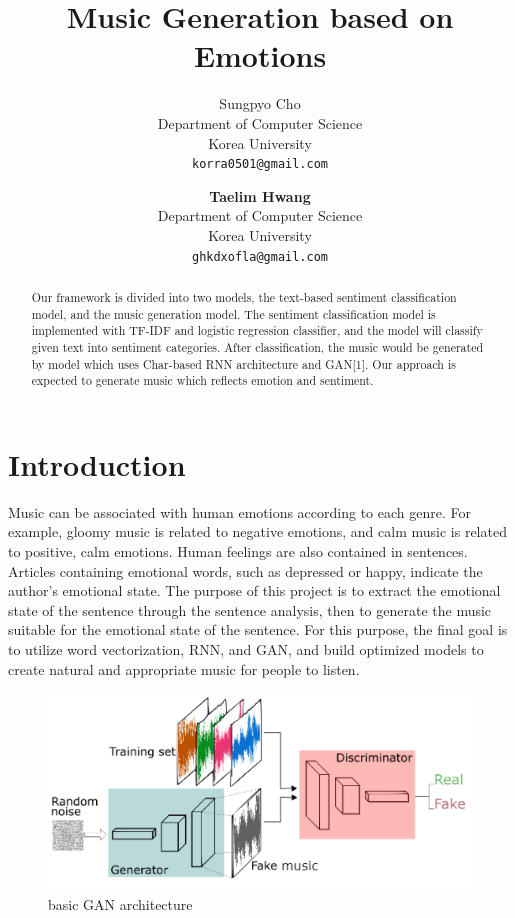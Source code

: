 \documentclass{article}
\title{Music Generation based on Emotions}
\author{
  Sungpyo Cho\\
  Department of Computer Science\\
  Korea University\\
  \texttt{korra0501@gmail.com}
  \and
  \textbf{Taelim Hwang}\\
  Department of Computer Science\\
  Korea University\\
  \texttt{ghkdxofla@gmail.com}
  }
\begin{document}

\maketitle

\begin{abstract}
    Our framework is divided into two models, the text-based sentiment classification model, and the music generation model. The sentiment classification model is implemented with TF-IDF and logistic regression classifier, and the model will classify given text into sentiment categories. After classification, the music would be generated by model which uses Char-based RNN architecture and GAN[1]. Our approach is expected to generate music which reflects emotion and sentiment.
\end{abstract}

\section{Introduction}

Music can be associated with human emotions according to each genre. For example, gloomy music is related to negative emotions, and calm music is related to positive, calm emotions. Human feelings are also contained in sentences. Articles containing emotional words, such as depressed or happy, indicate the author's emotional state. The purpose of this project is to extract the emotional state of the sentence through the sentence analysis, then to generate the music suitable for the emotional state of the sentence. For this purpose, the final goal is to utilize word vectorization, RNN, and GAN, and build optimized models to create natural and appropriate music for people to listen.

\begin{figure}[hbt!]
  \centering
  \includegraphics[scale=0.4]{./image/deep_gan.png}
  \caption{basic GAN architecture}
\end{figure}
\end{document}
